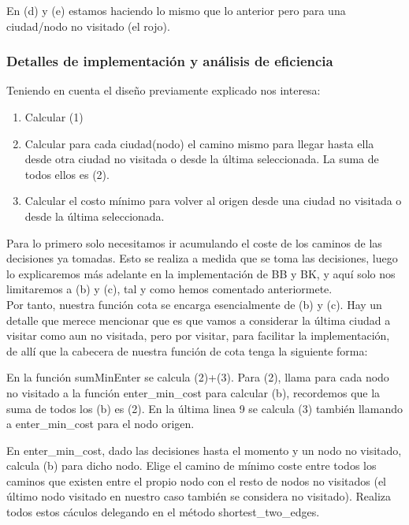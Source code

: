 \documentclass{article}
\begin{document}
En (d) y (e) estamos haciendo lo mismo que lo anterior pero para una ciudad/nodo no visitado (el rojo).

\subsubsection{Detalles de implementación y análisis de eficiencia}

Teniendo en cuenta el diseño previamente explicado nos interesa: 

\begin{enumerate}
    \item Calcular (1)
    \item Calcular para cada ciudad(nodo) el camino mismo para llegar hasta ella desde otra ciudad no visitada o desde la última seleccionada. La suma de todos ellos es (2). 
    \item Calcular el costo mínimo para volver al origen desde una ciudad no visitada o desde la última seleccionada.
\end{enumerate}

Para lo primero solo necesitamos ir acumulando el coste de los caminos de las decisiones ya tomadas. Esto se realiza a medida que se toma las decisiones, luego lo explicaremos más adelante en la implementación de BB y BK, y aquí solo nos limitaremos a (b) y (c), tal y como hemos comentado anteriormete. \\

Por tanto, nuestra función cota se encarga esencialmente de (b) y (c).
Hay un detalle que merece mencionar que es que vamos a considerar la última ciudad a visitar como aun no visitada, pero por visitar, para facilitar la implementación, de allí que la cabecera de nuestra función de cota tenga la siguiente forma: 



En la función sumMinEnter se calcula (2)+(3). Para (2), llama para cada nodo no visitado a la función enter\_min\_cost para calcular (b), recordemos que la suma de todos los (b) es (2). En la última linea 9  se calcula (3) también llamando a enter\_min\_cost para el nodo origen. 



En enter\_min\_cost, dado las decisiones hasta el momento y un nodo no visitado, calcula (b) para dicho nodo. Elige el camino de mínimo coste entre todos los caminos que existen entre el propio nodo con el resto de nodos no visitados (el último nodo visitado en nuestro caso también se considera no visitado). Realiza todos estos cáculos delegando en el 
método shortest\_two\_edges. 
\end{document}
